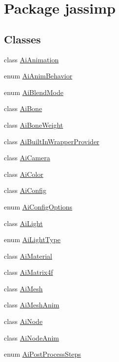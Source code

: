 \hypertarget{namespacejassimp}{\section{Package jassimp}
\label{namespacejassimp}
}
\subsection*{Classes}
\begin{DoxyCompactItemize}
\item 
class \hyperlink{classjassimp_1_1_ai_animation}{Ai\+Animation}
\item 
enum \hyperlink{enumjassimp_1_1_ai_anim_behavior}{Ai\+Anim\+Behavior}
\item 
enum \hyperlink{enumjassimp_1_1_ai_blend_mode}{Ai\+Blend\+Mode}
\item 
class \hyperlink{classjassimp_1_1_ai_bone}{Ai\+Bone}
\item 
class \hyperlink{classjassimp_1_1_ai_bone_weight}{Ai\+Bone\+Weight}
\item 
class \hyperlink{classjassimp_1_1_ai_built_in_wrapper_provider}{Ai\+Built\+In\+Wrapper\+Provider}
\item 
class \hyperlink{classjassimp_1_1_ai_camera}{Ai\+Camera}
\item 
class \hyperlink{classjassimp_1_1_ai_color}{Ai\+Color}
\item 
class \hyperlink{classjassimp_1_1_ai_config}{Ai\+Config}
\item 
enum \hyperlink{enumjassimp_1_1_ai_config_options}{Ai\+Config\+Options}
\item 
class \hyperlink{classjassimp_1_1_ai_light}{Ai\+Light}
\item 
enum \hyperlink{enumjassimp_1_1_ai_light_type}{Ai\+Light\+Type}
\item 
class \hyperlink{classjassimp_1_1_ai_material}{Ai\+Material}
\item 
class \hyperlink{classjassimp_1_1_ai_matrix4f}{Ai\+Matrix4f}
\item 
class \hyperlink{classjassimp_1_1_ai_mesh}{Ai\+Mesh}
\item 
class \hyperlink{classjassimp_1_1_ai_mesh_anim}{Ai\+Mesh\+Anim}
\item 
class \hyperlink{classjassimp_1_1_ai_node}{Ai\+Node}
\item 
class \hyperlink{classjassimp_1_1_ai_node_anim}{Ai\+Node\+Anim}
\item 
enum \hyperlink{enumjassimp_1_1_ai_post_process_steps}{Ai\+Post\+Process\+Steps}

\end{DoxyCompactItemize}
